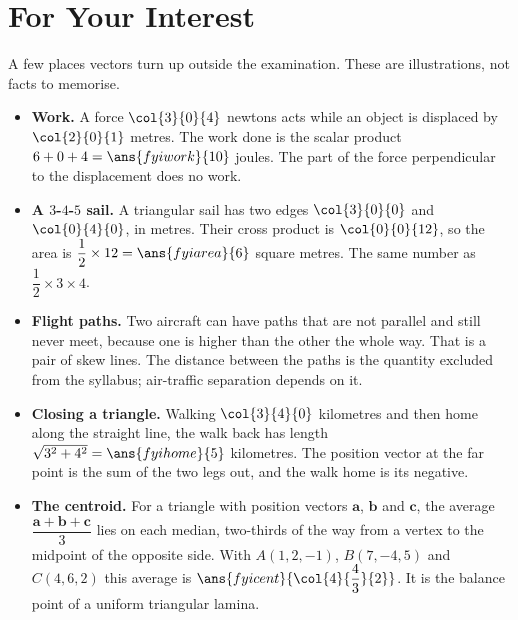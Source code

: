 \clearpage
{}
\section{For Your Interest}
A few places vectors turn up outside the examination. These are illustrations, not facts to memorise.
\begin{itemize}
  \setlength{\itemsep}{2.4mm}
  \item \textbf{Work.} A force $\col{3}{0}{4}$ newtons acts while an object is displaced by $\col{2}{0}{1}$ metres. The work done is the scalar product $6 + 0 + 4 = \ans{fyiwork}{10}$ joules. The part of the force perpendicular to the displacement does no work.
  \item \textbf{A $3$-$4$-$5$ sail.} A triangular sail has two edges $\col{3}{0}{0}$ and $\col{0}{4}{0}$, in metres. Their cross product is $\col{0}{0}{12}$, so the area is $\dfrac{1}{2}\times 12 = \ans{fyiarea}{6}$ square metres. The same number as $\dfrac{1}{2}\times 3\times 4$.
  \item \textbf{Flight paths.} Two aircraft can have paths that are not parallel and still never meet, because one is higher than the other the whole way. That is a pair of skew lines. The distance between the paths is the quantity excluded from the syllabus; air-traffic separation depends on it.
  \item \textbf{Closing a triangle.} Walking $\col{3}{4}{0}$ kilometres and then home along the straight line, the walk back has length $\sqrt{3^{2}+4^{2}} = \ans{fyihome}{5}$ kilometres. The position vector at the far point is the sum of the two legs out, and the walk home is its negative.
  \item \textbf{The centroid.} For a triangle with position vectors $\mathbf{a}$, $\mathbf{b}$ and $\mathbf{c}$, the average $\dfrac{\mathbf{a}+\mathbf{b}+\mathbf{c}}{3}$ lies on each median, two-thirds of the way from a vertex to the midpoint of the opposite side. With $A(1,2,-1)$, $B(7,-4,5)$ and $C(4,6,2)$ this average is $\ans{fyicent}{\col{4}{\dfrac{4}{3}}{2}}$. It is the balance point of a uniform triangular lamina.
\end{itemize}
